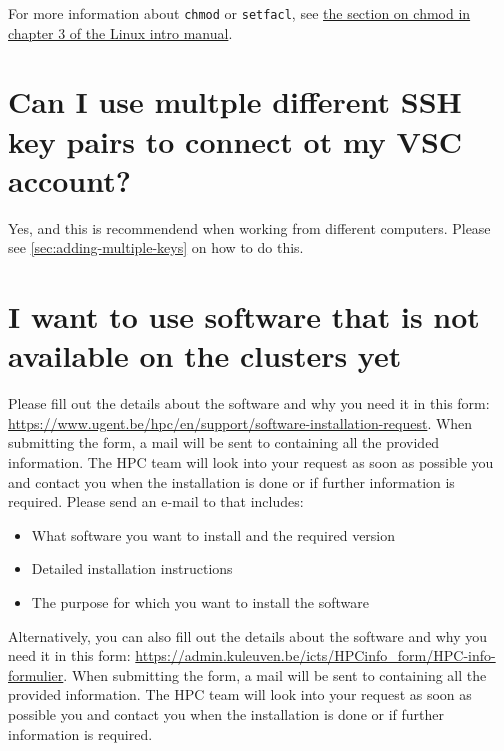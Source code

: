 For more information about \lstinline|chmod| or \lstinline|setfacl|, see \href{\LinuxManualURL#sec:chmod}
{the section on chmod in chapter 3 of the Linux intro manual}.

\section{Can I use multple different SSH key pairs to connect ot my VSC account?}

Yes, and this is recommendend when working from different computers. Please see
\autoref{sec:adding-multiple-keys} on how to do this.

\section{I want to use software that is not available on the clusters yet}

\ifgent
Please fill out the details about the software and why you need it in this form:
\url{https://www.ugent.be/hpc/en/support/software-installation-request}.
When submitting the form, a mail will be sent to \hpcinfo containing all the
provided information. The HPC team will look into your request as soon as possible
you and contact you when the installation is done or if further information is required.
\else
Please send an e-mail to \hpcinfo that includes:
\begin{itemize}
    \item What software you want to install and the required version
    \item Detailed installation instructions
    \item The purpose for which you want to install the software
\end{itemize}

\ifleuven
Alternatively, you can also fill out the details about the software and why you need it in this form:
\url{https://admin.kuleuven.be/icts/HPCinfo_form/HPC-info-formulier}.
When submitting the form, a mail will be sent to \hpcinfo containing all the
provided information. The HPC team will look into your request as soon as possible
you and contact you when the installation is done or if further information is required.
\fi
\fi

